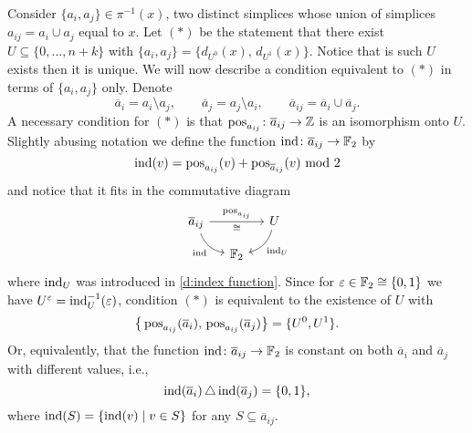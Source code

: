 Consider $\{a_i, a_j\} \in \pi^{-1}(x)$, two distinct simplices whose union of simplices $a_{ij} = a_i \cup a_j$ equal to $x$.
Let $(\ast)$ be the statement that there exist $U \subseteq \{0, \dots, n+k\}$ with $\{a_i, a_j\} = \{d_{U^0}(x),\, d_{U^1}(x)\}$.
Notice that is such $U$ exists then it is unique.
We will now describe a condition equivalent to $(\ast)$ in terms of $\{a_i, a_j\}$ only.
Denote
\begin{equation*}
\overline{a}_{i} = a_i \setminus a_j, \qquad
\overline{a}_{j} = a_j \setminus a_i, \qquad
\overline{a}_{ij} = \overline{a}_i \cup \overline{a}_j.
\end{equation*}
A necessary condition for $(\ast)$ is that $\operatorname{pos}_{a_{ij}} \colon \overline{a}_{ij} \to \mathbb{Z}$ is an isomorphism onto $U$.
Slightly abusing notation we define the function $\mathrm{ind} \colon \overline{a}_{ij} \to {\mathbb{F}_2}$ by
\begin{equation*}
\mathrm{ind}(v) = \operatorname{pos}_{a_{ij}}(v) + \operatorname{pos}_{\overline{a}_{ij}}(v) \text{ mod }2
\end{equation*}
and notice that it fits in the commutative diagram
\[
\begin{tikzcd}[column sep=small, row sep=small]
\overline{a}_{ij} \arrow[rr, "\pos_{a_{ij}}", "\cong"'] \arrow[dr, "\ind"', bend right] & &
U \arrow[dl, "\ind_U", bend left] \\
& \Ftwo &
\end{tikzcd}
\]
where $\mathrm{ind}_U$ was introduced in \cref{d:index function}.
Since for $\varepsilon \in {\mathbb{F}_2} \cong \{0,1\}$ we have $U^\varepsilon = \mathrm{ind}_U^{-1}(\varepsilon)$, condition $(\ast)$ is equivalent to the existence of $U$ with
\begin{equation} \label{e:pos's equal U's}
\big\{\operatorname{pos}_{a_{ij}}(\overline{a}_i),\, \operatorname{pos}_{a_{ij}}(\overline{a}_j)\big\} = \{U^0, U^1\}.
\end{equation}
Or, equivalently, that the function $\mathrm{ind} \colon \overline{a}_{ij} \to {\mathbb{F}_2}$ is constant on both $\overline{a}_i$ and $\overline{a}_j$ with different values, i.e.,
\begin{equation*}
\mathrm{ind}(\overline{a}_i) \operatorname{\triangle} \mathrm{ind}(\overline{a}_j) = \{0,1\},
\end{equation*}
where $\mathrm{ind}(S) = \{\mathrm{ind}(v) \mid v \in S\}$ for any $S \subseteq \overline{a}_{ij}$.


